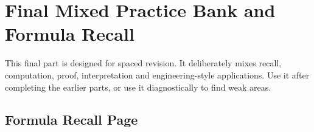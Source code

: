 \documentclass{otscience}
\begin{document}
\maketitle
\tableofcontents
\newpage
\fi

\section{Final Mixed Practice Bank and Formula Recall}

This final part is designed for spaced revision. It deliberately mixes recall, computation, proof, interpretation and engineering-style applications. Use it after completing the earlier parts, or use it diagnostically to find weak areas.

\subsection{Formula Recall Page}
\end{document}
